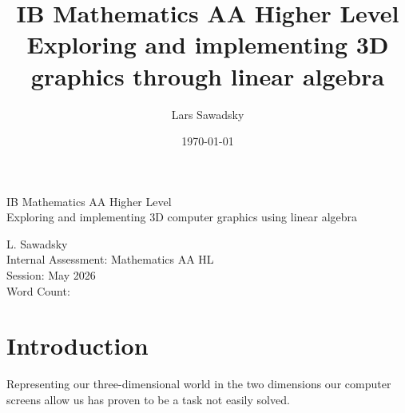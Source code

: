 \documentclass[12pt, a4paper]{article}
\title{
    IB Mathematics AA Higher Level\\
    
    Exploring and implementing 3D graphics through linear algebra
}
\author{Lars Sawadsky}
\date{\today}
\begin{document}
    \begin{titlepage}
        \begin{center}
            \vspace*{9cm}

            IB Mathematics AA Higher Level\\
            \medskip
            Exploring and implementing 3D computer graphics using linear algebra

            \vspace{8cm}

            L. Sawadsky\\
            Internal Assessment: Mathematics AA HL\\
            Session: May 2026\\
            Word Count:
        \end{center}
        \newpage
    \end{titlepage}

    \tableofcontents
    \newpage

    \section*{Introduction}
    
    Representing our three-dimensional world in the two dimensions
    our computer screens allow us has proven to be a task not easily
    solved.
\end{document}
